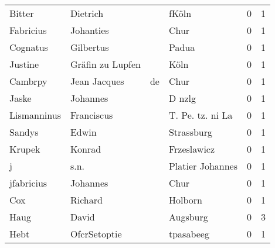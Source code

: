 \begin{center}
\begin{tiny}
\begin{longtabu}{llllrr}
                   Bitter &                           Dietrich &             &                                       fKöln &          0 &         1 \\
                Fabricius &                          Johanties &             &                                        Chur &          0 &         1 \\
                 Cognatus &                          Gilbertus &             &                                       Padua &          0 &         1 \\
                  Justine &                   Gräfin zu Lupfen &             &                                        Köln &          0 &         1 \\
                  Cambrpy &                       Jean Jacques &          de &                                        Chur &          0 &         1 \\
                    Jaske &                           Johannes &             &                                      D nzlg &          0 &         1 \\
              Lismanninus &                         Franciscus &             &                            T. Pe. tz. ni La &          0 &         1 \\
                   Sandys &                              Edwin &             &                                  Strassburg &          0 &         1 \\
                   Krupek &                             Konrad &             &                                 Frzeslawicz &          0 &         1 \\
                        j &                               s.n. &             &                            Platier Johannes &          0 &         1 \\
               jfabricius &                           Johannes &             &                                        Chur &          0 &         1 \\
                      Cox &                            Richard &             &                                     Holborn &          0 &         1 \\
                     Haug &                              David &             &                                    Augsburg &          0 &         3 \\
                     Hebt &                       OfcrSetoptie &             &                                   tpasabeeg &          0 &         1 \\

\end{longtabu}
\end{tiny}
\end{center}
